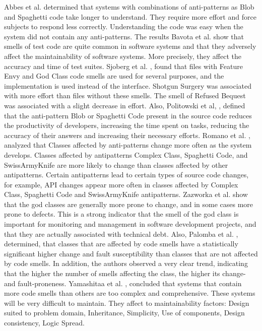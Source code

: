 \documentclass{sigchi}
\begin{document}
Abbes et al. \cite{Abbes} determined that systems with combinations of anti-patterns as Blob and Spaghetti code take longer to understand. They require more effort and force subjects to respond less correctly. Understanding the code was easy when the system did not contain any anti-patterns. The results Bavota et al. \cite{Bavota} show that smells of test code are quite common in software systems and that they adversely affect the maintainability of software systems. More precisely, they affect the accuracy and time of test suites. Sjoberg et al. \cite{Sjoberg}, found that files with Feature Envy and God Class code smells are used for several purposes, and the implementation is used instead of the interface. Shotgun Surgery was associated with more effort than files without these smells. The smell of Refused Bequest was associated with a slight decrease in effort. Also, Politowski et al, \cite{Politowskia}, defined that the anti-pattern Blob or Spaghetti Code present in the source code reduces the productivity of developers, increasing the time spent on tasks, reducing the accuracy of their answers and increasing their necessary efforts. Romano et al. \cite{Romano}, analyzed that Classes affected by anti-patterns change more often as the system develops. Classes affected by antipatterns Complex Class, Spaghetti Code, and SwissArmyKnife are more likely to change than classes affected by other antipatterns. Certain antipatterns lead to certain types of source code changes, for example, API changes appear more often in classes affected by Complex Class, Spaghetti Code and SwissArmyKnife antipatterns. Zazworka et al. \cite{Zazworka} show that the god classes are generally more prone to change, and in some cases more prone to defects. This is a strong indicator that the smell of the god class is important for monitoring and management in software development projects, and that they are actually associated with technical debt. Also, Palomba et al. \cite{Palomba2}, determined, that classes that are affected by code smells have a statistically significant higher change and fault susceptibility than classes that are not affected by code smells. In addition, the authors observed a very clear trend, indicating that the higher the number of smells affecting the class, the higher its change- and fault-proneness. Yamashitaa et al. \cite{Yamashita}, concluded that systems that contain more code smells than others are too complex and comprehensive. These systems will be very difficult to maintain. They affect to maintainability factors: Design suited to problem domain, Inheritance, Simplicity, Use of components, Design consistency, Logic Spread.
\end{document}

